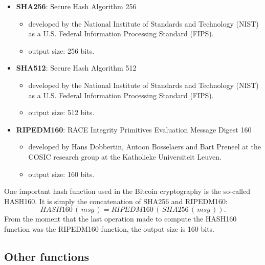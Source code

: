 \begin{itemize}
	\item \textbf{SHA256}: Secure Hash Algorithm 256
	\begin{itemize}
		\item developed by the National Institute of Standards and Technology (NIST) as a U.S. Federal Information Processing Standard (FIPS).
		\item output size: 256 bits.
	\end{itemize}
	\item \textbf{SHA512}: Secure Hash Algorithm 512
	\begin{itemize}
		\item developed by the National Institute of Standards and Technology (NIST) as a U.S. Federal Information Processing Standard (FIPS).
		\item output size: 512 bits.
	\end{itemize}
	\item \textbf{RIPEDM160}: RACE Integrity Primitives Evaluation Message Digest 160
	\begin{itemize}
		\item developed by Hans Dobbertin, Antoon Bosselaers and Bart Preneel at the COSIC research group at the Katholieke Universiteit Leuven. 
		\item output size: 160 bits.
	\end{itemize}
\end{itemize}
One important hash function used in the Bitcoin cryptography is the so-called HASH160. It is simply the concatenation of SHA256 and RIPEDM160:
\begin{equation*}
HASH160 \, (\, msg\, ) = RIPEDM160\, (\, SHA256 \, (\, msg \, )).
\end{equation*}
From the moment that the last operation made to compute the HASH160 function was the RIPEDM160 function, the output size is 160 bits.

\subsection{Other functions}

